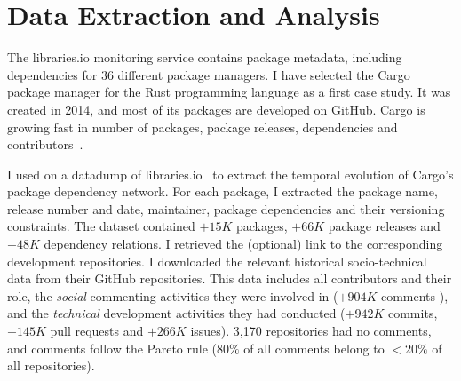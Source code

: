 \section{Data Extraction and Analysis} 

The \textsf{libraries.io} monitoring service contains package metadata, including dependencies for 36 different package managers.
I have selected the Cargo package manager for the Rust programming language as a first case study. It was created in 2014, and most of its packages are developed on GitHub. 
Cargo is growing fast in number of packages, package releases, dependencies and contributors~\cite{Decan2019EMSE}. 

I used on a datadump of \textsf{libraries.io}~\cite{Katz2018} to extract the temporal evolution of Cargo's package dependency network. 
For each package, I extracted %
 the package name, release number and date, maintainer, package dependencies and their versioning constraints. 
The dataset contained $+15K$ packages, $+66K$ package releases and $+48K$ dependency relations.
I retrieved the (optional) link to the corresponding development repositories. %
I downloaded the relevant historical socio-technical data from %
their GitHub repositories.
This data includes all contributors and their role, the \emph{social} commenting activities they were involved in ($+904K$ comments%
), and the \emph{technical} development activities they had conducted ($+942K$ commits, $+145K$ pull requests and $+266K$ issues).
3,170 repositories had no comments, and comments follow the Pareto rule ($80\%$ of all comments belong to $<20\%$ of all repositories).